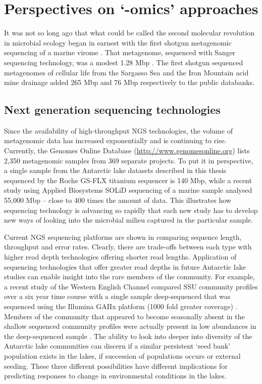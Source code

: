 \section{Perspectives on `-omics' approaches }
It was not so long ago that what could be called the second molecular revolution in microbial ecology began in earnest with the first shotgun metagenomic sequencing of a marine virome \cite{Breitbart2002}.
That metagenome, sequenced with Sanger sequencing technology, was a modest 1.28 Mbp \cite{Breitbart2002}.
The first shotgun sequenced metagenomes of cellular life from the Sargasso Sea \cite{Venter2004} and the Iron Mountain acid mine drainage \cite{Tyson2004} added 265 Mbp and 76 Mbp respectively to the public databanks.

\subsection{Next generation sequencing technologies}
Since the availability of high-throughput \ac{NGS} technologies, the volume of metagenomic data has increased exponentially and is continuing to rise.
Currently, the Genomes Online Database (\url{http://www.genomesonline.org}) lists 2,350 metagenomic samples from 369 separate projects.
To put it in perspective, a single sample from the Antarctic lake datasets described in this thesis sequenced by the Roche GS-FLX titanium sequencer is 140 Mbp, while a recent study using Applied Biosystems SOLiD sequencing of a marine sample \cite{Iverson2012} analysed 55,000 Mbp -- close to 400 times the amount of data.
This illustrates how sequencing technology is advancing so rapidly that each new study has to develop new ways of looking into the microbial milieu captured in the particular sample.

Current \ac{NGS} sequencing platforms are shown in  comparing sequence length, throughput and error rates.
Clearly, there are trade-offs between each type with higher read depth technologies offering shorter read lengths. 
Application of sequencing technologies that offer greater read depths in future Antarctic lake studies can enable insight into the rare members of the community.
For example, a recent study of the Western English Channel compared \acs{SSU} community profiles over a six year time course with a single sample deep-sequenced that was sequenced using the Illumina GAIIx platform (1000 fold greater coverage) \cite{Caporaso2012}.
Members of the community that appeared to become seasonally absent in the shallow sequenced community profiles were actually present in low abundances in the deep-sequenced sample \cite{Caporaso2012}.
The ability to look into deeper into diversity of the Antarctic lake communities can discern if a similar persistent `seed bank' population exists in the lakes, if succession of populations occurs or external seeding.
These three different possibilities have different implications for predicting responses to change in environmental conditions in the lakes.


